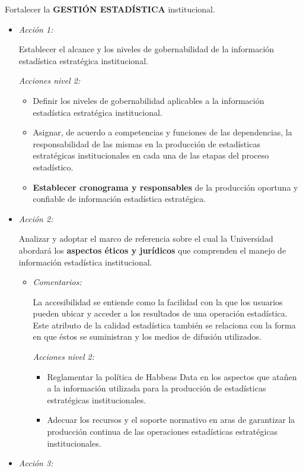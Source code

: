\documentclass[
]{book}
\providecommand{\tightlist}{%
  \setlength{\itemsep}{0pt}\setlength{\parskip}{0pt}}
\begin{document}
\begin{itemize}
  Fortalecer la \textbf{GESTIÓN ESTADÍSTICA} institucional.

  \begin{itemize}
  \item
    \emph{Acción 1:}

    Establecer el alcance y los niveles de gobernabilidad de la información estadística estratégica institucional.

    \emph{Acciones nivel 2:}

    \begin{itemize}
    \tightlist
    \item
      Definir los niveles de gobernabilidad aplicables a la información estadística estratégica institucional.
    \item
      Asignar, de acuerdo a competencias y funciones de las dependencias, la responsabilidad de las mismas en la producción de estadísticas estratégicas institucionales en cada una de las etapas del proceso estadístico.
    \item
      \textbf{Establecer cronograma y responsables} de la producción oportuna y confiable de información estadística estratégica.
    \end{itemize}
  \item
    \emph{Acción 2:}

    Analizar y adoptar el marco de referencia sobre el cual la Universidad abordará los \textbf{aspectos éticos y jurídicos} que comprenden el manejo de información estadística institucional.

    \begin{itemize}
    \item
      \emph{Comentarios:}

      La accesibilidad se entiende como la facilidad con la que los usuarios pueden ubicar y acceder a los resultados de una operación estadística. Este atributo de la calidad estadística también se relaciona con la forma en que éstos se suministran y los medios de difusión utilizados.

      \emph{Acciones nivel 2:}

      \begin{itemize}
      \tightlist
      \item
        Reglamentar la política de Habbeas Data en los aspectos que atañen a la información utilizada para la producción de estadísticas estratégicas institucionales.
      \item
        Adecuar los recursos y el soporte normativo en aras de garantizar la producción continua de las operaciones estadísticas estratégicas institucionales.
      \end{itemize}
    \end{itemize}
  \item
    \emph{Acción 3:}


\end{itemize}
\end{itemize}
\end{document}
